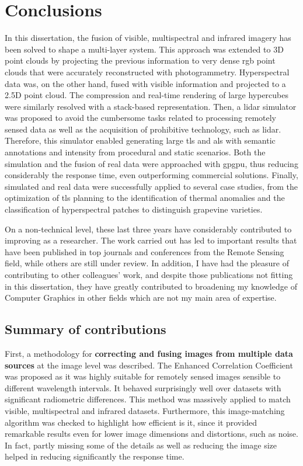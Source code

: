 \setchapterpreamble[u]{\margintoc}
\chapter{Conclusions}
\label{sec:conclusions}

In this dissertation, the fusion of visible, multispectral and infrared imagery has been solved to shape a multi-layer system. This approach was extended to 3D point clouds by projecting the previous information to very dense \acrshort{rgb} point clouds that were accurately reconstructed with photogrammetry. Hyperspectral data was, on the other hand, fused with visible information and projected to a 2.5D point cloud. The compression and real-time rendering of large hypercubes were similarly resolved with a stack-based representation. Then, a \acrshort{lidar} simulator was proposed to avoid the cumbersome tasks related to processing remotely sensed data as well as the acquisition of prohibitive technology, such as \acrshort{lidar}. Therefore, this simulator enabled generating large \acrshort{tls} and \acrshort{als} with semantic annotations and intensity from procedural and static scenarios. Both the simulation and the fusion of real data were approached with \acrshort{gpgpu}, thus reducing considerably the response time, even outperforming commercial solutions. Finally, simulated and real data were successfully applied to several case studies, from the optimization of \acrshort{tls} planning to the identification of thermal anomalies and the classification of hyperspectral patches to distinguish grapevine varieties.

On a non-technical level, these last three years have considerably contributed to improving as a researcher. The work carried out has led to important results that have been published in top journals and conferences from the Remote Sensing field, while others are still under review. In addition, I have had the pleasure of contributing to other colleagues' work, and despite those publications not fitting in this dissertation, they have greatly contributed to broadening my knowledge of Computer Graphics in other fields which are not my main area of expertise. 

\section{Summary of contributions}

First, a methodology for \textbf{correcting and fusing images from multiple data sources} at the image level was described. The Enhanced Correlation Coefficient was proposed as it was highly suitable for remotely sensed images sensible to different wavelength intervals. It behaved surprisingly well over datasets with significant radiometric differences. This method was massively applied to match visible, multispectral and infrared datasets. Furthermore, this image-matching algorithm was checked to highlight how efficient is it, since it provided remarkable results even for lower image dimensions and distortions, such as noise. In fact, partly missing some of the details as well as reducing the image size helped in reducing significantly the response time. 

